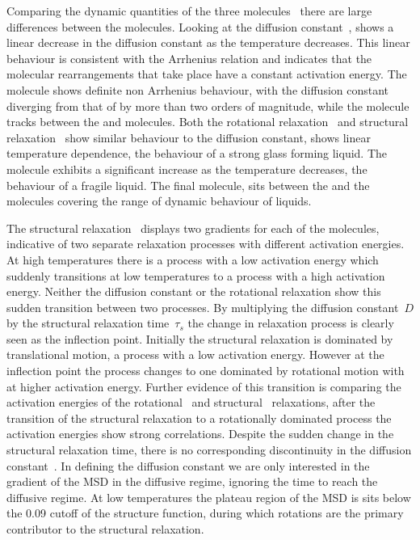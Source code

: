 Comparing the dynamic quantities of the three molecules~ there are large differences between the molecules. Looking at the diffusion constant~, \done shows a linear decrease in the diffusion constant as the temperature decreases. This linear behaviour is consistent with the Arrhenius relation and indicates that the molecular rearrangements that take place have a constant activation energy. The \dcon molecule shows definite non Arrhenius behaviour, with the diffusion constant diverging from that of \done by more than two orders of magnitude, while the \tri molecule tracks between the \done and \dcon molecules. Both the rotational relaxation~ and structural relaxation~ show similar behaviour to the diffusion constant, \done shows linear temperature dependence, the behaviour of a strong glass forming liquid. The \dcon molecule exhibits a significant increase as the temperature decreases, the behaviour of a fragile liquid. The final molecule, \tri sits between the \done and the \dcon molecules covering the range of dynamic behaviour of liquids.

The structural relaxation~ displays two gradients for each of the molecules, indicative of two separate relaxation processes with different activation energies. At high temperatures there is a process with a low activation energy which suddenly transitions at low temperatures to a process with a high activation energy. Neither the diffusion constant or the rotational relaxation show this sudden transition between two processes. By multiplying the diffusion constant~$D$ by the structural relaxation time~$\tau_s$  the change in relaxation process is clearly seen as the inflection point. Initially the structural relaxation is dominated by translational motion, a process with a low activation energy. However at the inflection point the process changes to one dominated by rotational motion with at higher activation energy. Further evidence of this transition is comparing the activation energies of the rotational~ and structural~ relaxations, after the transition of the structural relaxation to a rotationally dominated process the activation energies show strong correlations. Despite the sudden change in the structural relaxation time, there is no corresponding discontinuity in the diffusion constant~. In defining the diffusion constant we are only interested in the gradient of the MSD in the diffusive regime, ignoring the time to reach the diffusive regime. At low temperatures the plateau region of the MSD is sits below the 0.09 cutoff of the structure function, during which rotations are the primary contributor to the structural relaxation. 

